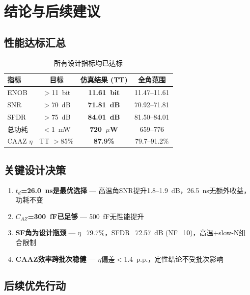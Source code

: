 \documentclass[11pt,a4paper,UTF8]{ctexart}
\newcommand{\keydata}[1]{\textbf{\color{primaryblue}#1}}
\begin{document}
\section{结论与后续建议}
\label{sec:conclusion}

\subsection{性能达标汇总}

\begin{table}[htbp]
\centering
\caption{所有设计指标均已达标}
\label{tab:final}
\begin{tabular}{lccc}
\toprule
\textbf{指标} & \textbf{目标} & \textbf{仿真结果 (TT)} & \textbf{全角范围} \\
\midrule
ENOB & $>$11~bit & \keydata{11.61~bit} & 11.47--11.61 \\
SNR & $>$70~dB & \keydata{71.81~dB} & 70.92--71.81 \\
SFDR & $>$75~dB & \keydata{84.01~dB} & 81.50--84.01 \\
总功耗 & $<$1~mW & \keydata{720~$\mu$W} & 659--776 \\
CAAZ $\eta$ & TT $>$85\% & \keydata{87.9\%} & 79.7--91.2\% \\
\bottomrule
\end{tabular}
\end{table}

\subsection{关键设计决策}

\begin{enumerate}
  \item \textbf{$t_d$=26.0~ns是最优选择} --- 高温角SNR提升1.8--1.9~dB，26.5~ns无额外收益，功耗不变
  \item \textbf{$C_{AZ}$=300~fF已足够} --- 500~fF无性能提升
  \item \textbf{SF角为设计瓶颈} --- $\eta$=79.7\%，SFDR=72.57~dB (NF=10)，高温+slow-N组合限制
  \item \textbf{CAAZ效率跨批次稳健} --- $\eta$偏差$<$1.4~p.p.，定性结论不受批次影响
\end{enumerate}

\subsection{后续优先行动}
\end{document}
